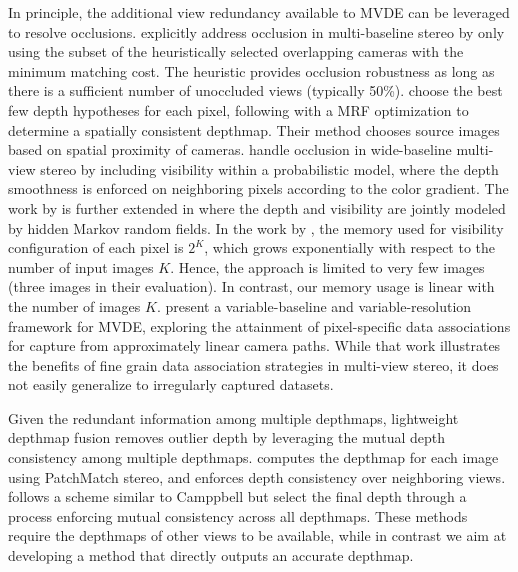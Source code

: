 In principle, the additional view  redundancy available to MVDE can be leveraged to resolve occlusions. \citet{handle_occlusion2001} explicitly address occlusion in multi-baseline stereo by only using the subset of the heuristically selected overlapping cameras with the minimum matching cost. The heuristic provides occlusion robustness as long as there is a sufficient number of unoccluded views (typically 50\%). \citet{MultiHypothesis_ECCV2008} choose the best few depth hypotheses for each pixel, following with a MRF optimization to determine a spatially consistent depthmap. Their method chooses source images based on spatial proximity of cameras. \citet{Strecha_BayesModelCVPR2004} handle occlusion in wide-baseline multi-view stereo by including visibility within a probabilistic model, where the depth smoothness is enforced on neighboring pixels according to the color gradient. The work by \citet{Strecha_BayesModelCVPR2004} is further extended in \citet{CombinedDepthOutlier} where the depth and visibility are jointly modeled by hidden Markov random fields. In the work by \citet{CombinedDepthOutlier}, the memory used for visibility configuration of each pixel is $2^K$, which grows exponentially with respect to the number of input images $K$. Hence, the approach is limited to very few images (three images in their evaluation). In contrast, our memory usage is linear with the number of images $K$. %
\citet{Gallup08} present a variable-baseline and variable-resolution framework for MVDE, exploring the attainment of pixel-specific data associations for capture from approximately linear camera paths. While that work illustrates the benefits of fine grain data association strategies in multi-view stereo, it does not easily generalize to irregularly captured datasets. %

Given the redundant information among multiple depthmaps,
lightweight depthmap fusion removes outlier depth by leveraging the mutual depth consistency among multiple depthmaps. 
\citet{Shen_TIP2013} computes the depthmap for each image using PatchMatch \mbox{stereo}, and enforces depth consistency over neighboring views. \citet{LeastCommitment_3DIMPVT2012} follows a scheme similar to Camppbell \citet{MultiHypothesis_ECCV2008} but select the final depth through a process enforcing mutual consistency across all depthmaps. These methods require the depthmaps of other views to be available, while in contrast we aim at developing a method that directly outputs an accurate depthmap. 

